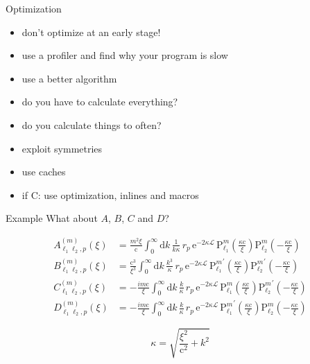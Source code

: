 \documentclass[12pt,compress,mathserif]{beamer}
\newcommand{\Plm}[2]{{\text{P}_{#1}^{#2}}}
\newcommand{\imag}{i}
\renewcommand{\c}{\mathrm{c}}
\newcommand{\e}{\mathrm{e}}
\begin{document}
\begin{frame}{Optimization}
\begin{itemize}
    \item don't optimize at an early stage!
    \item use a profiler and find why your program is slow
    \item use a better algorithm
    \item do you have to calculate everything?
    \item do you calculate things to often?
    \item exploit symmetries
    \item use caches
    \item if C: use optimization, inlines and macros
\end{itemize}
\end{frame}

\begin{frame}{Example}
What about $A$, $B$, $C$ and $D$?

\begin{align}
\nonumber
A_{\ell_1 \ell_2,p}^{(m)}(\xi) &= \frac{m^2 \xi}{\c} \int_0^\infty \mathrm{d}k \, \frac{1}{k \kappa} \, r_p \, \e^{-2\kappa\mathcal{L}} \, \Plm{\ell_1}{m}\left(\frac{\kappa\c}{\xi}\right) \Plm{\ell_2}{m}\left(-\frac{\kappa\c}{\xi}\right) \\
\nonumber
B_{\ell_1 \ell_2,p}^{(m)}(\xi) &= \frac{\c^3}{\xi^3} \int_0^\infty \mathrm{d}k \, \frac{k^3}{\kappa} \, r_p \, \e^{-2\kappa\mathcal{L}} \, \Plm{\ell_1}{m}^\prime\left(\frac{\kappa\c}{\xi}\right) \Plm{\ell_2}{m}^\prime\left(-\frac{\kappa\c}{\xi}\right) \\
\nonumber
C_{\ell_1 \ell_2,p}^{(m)}(\xi) &= -\frac{\imag m\c}{\xi} \int_0^\infty \mathrm{d}k \, \frac{k}{\kappa} \, r_p \, \e^{-2\kappa\mathcal{L}} \, \Plm{\ell_1}{m}\left(\frac{\kappa\c}{\xi}\right) \Plm{\ell_2}{m}^\prime\left(-\frac{\kappa\c}{\xi}\right) \\
\nonumber
D_{\ell_1 \ell_2,p}^{(m)}(\xi) &= -\frac{\imag m\c}{\xi} \int_0^\infty \mathrm{d}k \, \frac{k}{\kappa} \, r_p \, \e^{-2\kappa\mathcal{L}} \, \Plm{\ell_1}{m}^\prime\left(\frac{\kappa\c}{\xi}\right) \Plm{\ell_2}{m}\left(-\frac{\kappa\c}{\xi}\right)
\end{align}

\begin{equation}
\nonumber
\kappa = \sqrt{\frac{\xi^2}{\c^2}+k^2}
\end{equation}
\end{frame}
\end{document}
